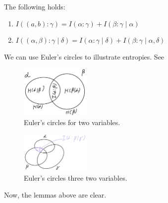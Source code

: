 \begin{lemma}
    The following holds:
    \begin{enumerate}
        \item $I((a, b) : \gamma) = I(\alpha : \gamma) + I(\beta : \gamma \mid \alpha)$
        \item  $I((\alpha, \beta) : \gamma \mid \delta) = I(\alpha : \gamma \mid \delta) + I(\beta : \gamma \mid \alpha, \delta)$
    \end{enumerate}
\end{lemma}

We can use Euler's circles to illustrate entropies.
See 

\begin{figure}[H]
    \centering
    \includegraphics[width=0.3\textwidth]{figures/AE3E659E-8B57-4C03-B616-54B5FACAC858}
    \caption{Euler's circles for two variables.}
    \label{fig:ae3e659e-8b57-4c03-b616-54b5facac858}
\end{figure}

\begin{figure}[H]
    \centering
    \includegraphics[width=0.3\textwidth]{figures/C3CCBAFA-9451-4D04-BBF1-B50DC41CF6FD}
    \caption{Euler's circles three two variables.}
    \label{fig:c3ccbafa-9451-4d04-bbf1-b50dc41cf6fd}
\end{figure}

Now, the lemmas above are clear.


